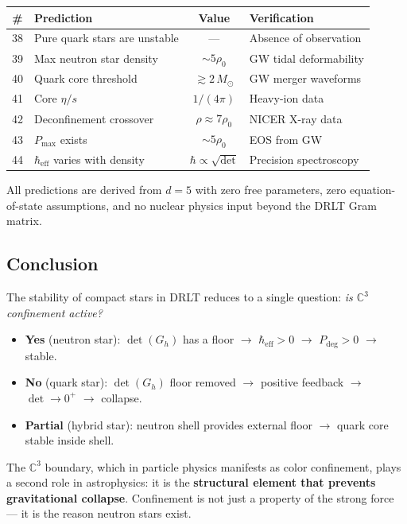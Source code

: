 \documentclass[12pt]{article}
\theoremstyle{remark}
\theoremstyle{definition}
\newcommand{\CC}{\mathbb{C}}
\begin{document}
\begin{center}
\begin{tabular}{clcl}
\hline
\# & Prediction & Value & Verification \\
\hline
38 & Pure quark stars are unstable & --- & Absence of observation \\
39 & Max neutron star density & $\sim 5\rho_0$ & GW tidal deformability \\
40 & Quark core threshold & $\gtrsim 2\,M_\odot$ & GW merger waveforms \\
41 & Core $\eta/s$ & $1/(4\pi)$ & Heavy-ion data \\
42 & Deconfinement crossover & $\rho \approx 7\rho_0$ & NICER X-ray data \\
43 & $P_\text{max}$ exists & $\sim 5\rho_0$ & EOS from GW \\
44 & $\hbar_\text{eff}$ varies with density & $\hbar \propto \sqrt{\det}$ & Precision spectroscopy \\
\hline
\end{tabular}
\end{center}

All predictions are derived from $d = 5$ with zero free parameters, zero equation-of-state assumptions, and no nuclear physics input beyond the DRLT Gram matrix.

\subsection{Conclusion}

The stability of compact stars in DRLT reduces to a single question: \emph{is $\CC^3$ confinement active?}

\begin{itemize}
\item \textbf{Yes} (neutron star): $\det(G_h)$ has a floor $\to$ $\hbar_\text{eff} > 0$ $\to$ $P_\text{deg} > 0$ $\to$ stable.
\item \textbf{No} (quark star): $\det(G_h)$ floor removed $\to$ positive feedback $\to$ $\det \to 0^+$ $\to$ collapse.
\item \textbf{Partial} (hybrid star): neutron shell provides external floor $\to$ quark core stable inside shell.
\end{itemize}

The $\CC^3$ boundary, which in particle physics manifests as color confinement, plays a second role in astrophysics: it is the \textbf{structural element that prevents gravitational collapse}. Confinement is not just a property of the strong force --- it is the reason neutron stars exist.
\end{document}
